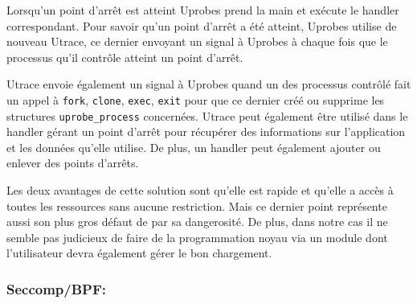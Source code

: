 Lorsqu'un point d'arrêt est atteint Uprobes prend la main et exécute le handler
correspondant. Pour savoir qu'un point d'arrêt a été atteint, Uprobes utilise de
nouveau Utrace, ce dernier envoyant un signal à Uprobes à chaque fois que le
processus qu'il contrôle atteint un point d'arrêt.

Utrace envoie également un signal à Uprobes quand un des processus contrôlé fait
un appel à \texttt{fork}, \texttt{clone}, \texttt{exec}, \texttt{exit} pour que
ce dernier créé ou supprime les structures \texttt{uprobe\_process}
concernées. Utrace peut également être utilisé dans le handler gérant un point
d'arrêt pour récupérer des informations sur l'application et les données qu'elle
utilise. De plus, un handler peut également ajouter ou enlever des points
d'arrêts.

Les deux avantages de cette solution sont qu'elle est rapide et qu'elle a accès
à toutes les ressources sans aucune restriction. Mais ce dernier point
représente aussi son plus gros défaut de par sa dangerosité. De plus, dans notre
cas il ne semble pas judicieux de faire de la programmation noyau via un module
dont l'utilisateur devra également gérer le bon chargement.

\subsubsection{Seccomp/BPF:}
\label{paragraph:seccomp/bpf}

